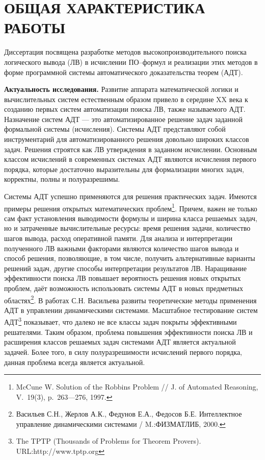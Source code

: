\documentclass[a4paper]{report}
\begin{document}
\newpage

\section*{ОБЩАЯ ХАРАКТЕРИСТИКА РАБОТЫ}

Диссертация посвящена разработке методов высокопроизводительного поиска логического вывода (ЛВ) в исчислении ПО--формул и реализации этих методов в форме программной системы автоматического доказательства теорем (АДТ).

\textbf{Актуальность исследования.}
Развитие аппарата математической логики и вычислительных систем естественным образом привело в середине XX века к созданию первых систем автоматизации поиска ЛВ, также называемого АДТ. Назначение систем АДТ --- это автоматизированное решение задач заданной формальной системы (исчисления). Системы АДТ представляют собой инструментарий для автоматизированного решения довольно широких классов задач. Решения строятся как ЛВ утверждения в заданном исчислении. Основным классом исчислений в современных системах АДТ являются исчисления первого порядка, которые достаточно выразительны для формализации многих задач, корректны, полны и полуразрешимы.  %

Системы АДТ успешно применяются для решения практических задач. Имеются примеры решения открытых математических проблем\footnote{McCune W. Solution of the Robbins Problem // J. of Automated Reasoning, V.~19(3), p.~263---276, 1997.}. Причем, важен не только сам факт установления выводимости формулы и ширина класса решаемых задач, но и затраченные вычислительные ресурсы: время решения задачи, количество шагов вывода, расход оперативной памяти. Для анализа и интерпретации полученного ЛВ важными факторами являются количество шагов вывода и способ решения, позволяющие, в том числе, получить альтернативные варианты решений задач, другие способы интерпретации результатов ЛВ. Наращивание эффективности поиска ЛВ повышает вероятность решения новых открытых проблем, даёт возможность использовать системы АДТ в новых предметных областях\footnote{Васильев С.Н., Жерлов А.К., Федунов Е.А., Федосов Б.Е.  Интеллектное управление динамическими системами /  M.:ФИЗМАТЛИБ, 2000.}. В работах С.Н. Васильева развиты теоретические методы применения АДТ в управлении динамическими системами. Масштабное тестирование систем АДТ\footnote{The TPTP (Thousands of Problems for Theorem Provers). URL:http://www.tptp.org} показывает, что далеко не все классы задач покрыты эффективными решателями. Таким образом, проблема повышения эффективности поиска ЛВ и расширения классов решаемых задач системами АДТ является актуальной задачей. Более того, в силу полуразрешимости исчислений первого порядка, данная проблема всегда является актуальной. %
\end{document}
